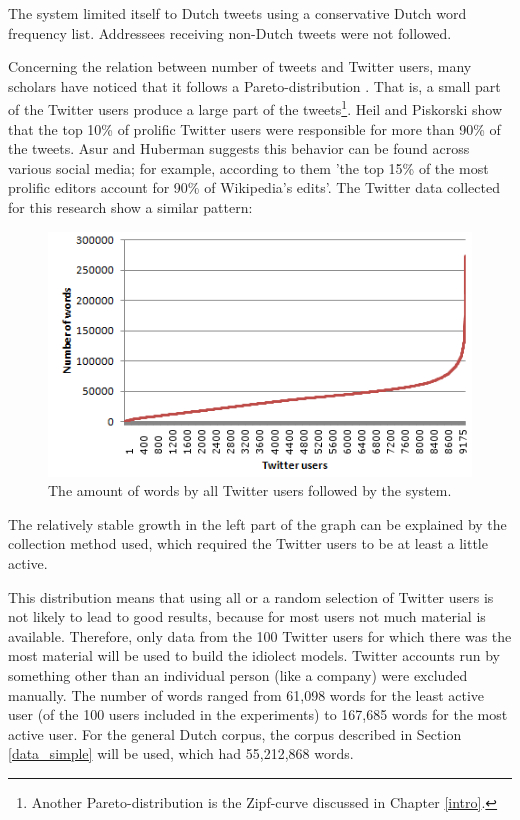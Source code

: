 \documentclass[11pt]{article}
\begin{document}
The system limited itself to Dutch tweets using a conservative Dutch word frequency list. Addressees receiving non-Dutch tweets were not followed.

Concerning the relation between number of tweets and Twitter users, many scholars have noticed that it follows a Pareto-distribution \cite{asur+10,rui+12}. That is, a small part of the Twitter users produce a large part of the tweets\footnote{Another Pareto-distribution is the Zipf-curve discussed in Chapter \ref{intro}.}. Heil and Piskorski  show that the top 10\% of prolific Twitter users were responsible for more than 90\% of the tweets. Asur and Huberman  suggests this behavior can be found across various social media; for example, according to them 'the top 15\% of the most prolific editors account for 90\% of Wikipedia's edits'. The Twitter data collected for this research show a similar pattern:

\begin{figure}[H] \centering
\includegraphics[scale=1]{zipf_twitter}
\caption{The amount of words by all Twitter users followed by the system.}
\label{lcurve}
\end{figure} 

The relatively stable growth in the left part of the graph can be explained by the collection method used, which required the Twitter users to be at least a little active. 

This distribution means that using all or a random selection of Twitter users is not likely to lead to good results, because for most users not much material is available. Therefore, only data from the 100 Twitter users for which there was the most material will be used to build the idiolect models. Twitter accounts run by something other than an individual person (like a company) were excluded manually. The number of words ranged from 61,098 words for the least active user (of the 100 users included in the experiments) to 167,685 words for the most active user. For the general Dutch corpus, the corpus described in Section \ref{data_simple} will be used, which had 55,212,868 words.
\end{document}
